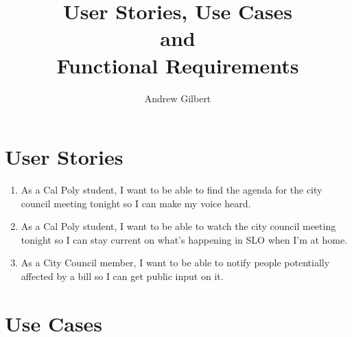 \documentclass{article}
\title{User Stories, Use Cases\\
  {\large and}\\
  Functional Requirements}
\author{Andrew Gilbert}
\newcommand{\story}[3]{\item As a #1, I want to be able to #2 so I can #3.}
\begin{document}
\maketitle
\tableofcontents
\section{User Stories}
\begin{enumerate}
\story{Cal Poly student}{find the agenda for the city council meeting
  tonight}{make my voice heard}\label{agenda}
\story{Cal Poly student}{watch the city council meeting tonight}{stay
  current on what's happening in SLO when I'm at home}
\story{City Council member}{notify people potentially affected by a
  bill}{get public input on it}
\end{enumerate}
\section{Use Cases}
\end{document}
